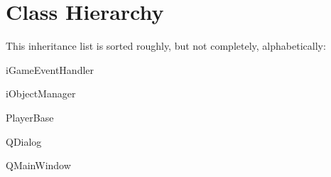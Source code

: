 \section{Class Hierarchy}
This inheritance list is sorted roughly, but not completely, alphabetically\-:\begin{DoxyCompactList}
\item i\-Game\-Event\-Handler\begin{DoxyCompactList}
\item {}
\end{DoxyCompactList}
\item i\-Object\-Manager\begin{DoxyCompactList}
\item {}
\end{DoxyCompactList}
\item Player\-Base\begin{DoxyCompactList}
\item {}
\end{DoxyCompactList}
\item Q\-Dialog\begin{DoxyCompactList}
\item {}
\item {}
\end{DoxyCompactList}
\item Q\-Main\-Window\begin{DoxyCompactList}
\item {}
\end{DoxyCompactList}
\end{DoxyCompactList}
